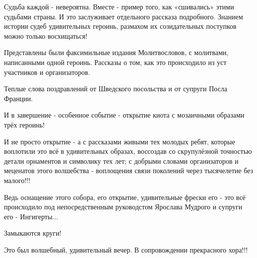 Судьба каждой - невероятна. Вместе - пример того, как «сшивались» этими
судьбами страны. И это заслуживает отдельного рассказа подробного. Знанием
истории судеб удивительных героинь, размахом их созидательных поступков можно
только восхищаться! 


Представлены были факсимильные издания Молитвословов, с молитвами, написанными
одной героинь. Рассказы о том, как это происходило из уст участников и
организаторов. 

Теплые слова поздравлений от Шведского посольства и от супруги Посла Франции.

И в завершение - особенное событие - открытие киота с мозаичными образами трёх
героинь!


И не просто открытие - а с рассказами живыми тех молодых ребят, которые
воплотили это всё в удивительных образах, воссоздав со скрупулёзной точностью
детали орнаментов и символику тех лет; с добрыми словами организаторов и
меценатов этого волшебства - воплощения связи поколений через тысячелетие без
малого!!!


Ведь оснащение этого собора, его открытие, удивительные фрески его - это всё
происходило под непосредственным руководстом Ярослава Мудрого и супруги его -
Ингигерты...

Замыкаются круги! 

Это был волшебный, удивительный вечер. В сопровождении прекрасного хора!!!
